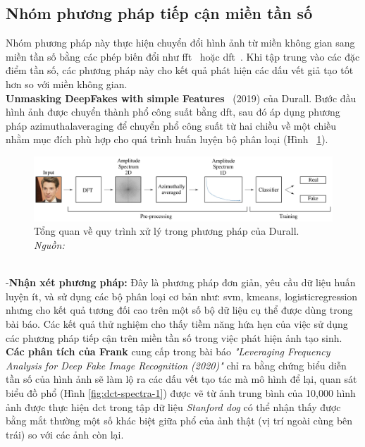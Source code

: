 \subsection{Nhóm phương pháp tiếp cận miền tần số}
Nhóm phương pháp này thực hiện chuyển đổi hình ảnh từ miền không gian sang miền tần số bằng các phép biến đổi như \gls{fft}~\cite{Arunachalam2013TheFF} hoặc \gls{dft}~\cite{1672377}.
Khi tập trung vào các đặc điểm tần số, các phương pháp này cho kết quả phát hiện các dấu vết giả tạo tốt hơn so với miền không gian.\\
%
\textbf{Unmasking DeepFakes with simple Features}~\cite{durall2019unmasking} (2019) của Durall.
Bước đầu hình ảnh được chuyển thành phổ công suất bằng \gls{dft}, sau đó áp dụng phương pháp \gls{azimuthalaveraging} để chuyển phổ công suất từ hai chiều về một chiều nhằm mục đích phù hợp cho quá trình huấn luyện bộ phân loại (Hình ~\ref{fig:model-unmasking-deepfakes-1}).
%
\begin{figure}[h]
	\centering
	\includegraphics[width=1.0\linewidth]{Images/model-unmasking-deepfakes-1.png}
	\begin{minipage}{0.9\linewidth}
		\caption{Tổng quan về quy trình xử lý trong phương pháp của Durall. \textit{Nguồn: \cite{durall2019unmasking}}}
		\label{fig:model-unmasking-deepfakes-1}
	\end{minipage}
\end{figure}\\
%
%
-\textbf{Nhận xét phương pháp:}
Đây là phương pháp đơn giản, yêu cầu dữ liệu huấn luyện ít, và sử dụng các bộ phân loại cơ bản như: \gls{svm}, \gls{kmeans}, \gls{logisticregression} nhưng cho kết quả tương đối cao trên một số bộ dữ liệu cụ thể được dùng trong bài báo. Các kết quả thử nghiệm cho thấy tiềm năng hứa hẹn của việc sử dụng các phương pháp tiếp cận trên miền tần số trong việc phát hiện ảnh tạo sinh.\\
%
\textbf{Các phân tích của Frank}\cite{Frank2020LeveragingFA} cung cấp trong bài báo \textit{"Leveraging Frequency Analysis for Deep Fake Image Recognition (2020)"} chỉ ra bằng chứng biểu diễn tần số của hình ảnh sẽ làm lộ ra các dấu vết tạo tác mà mô hình để lại, quan sát biểu đồ phổ (Hình \ref{fig:dct-spectra-1}) được vẽ từ ảnh trung bình của 10,000 hình ảnh được thực hiện \gls{dct} trong tập dữ liệu \textit{Stanford dog} có thể nhận thấy được bằng mắt thường một số khác biệt giữa phổ của ảnh thật (vị trí ngoài cùng bên trái) so với các ảnh còn lại.
